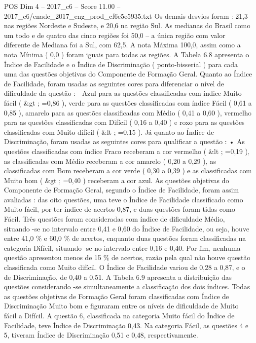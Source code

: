 \begin{textsample}{POS Dim 4 – 2017\_c6 – Score 11.00 – 2017\_c6/enade\_2017\_eng\_prod\_cf6e5e5935.txt}
Os demais desvios foram : 21,3 nas regiões Nordeste e Sudeste, e 20,6 na região Sul.
As medianas do Brasil como um todo e de quatro das cinco regiões foi 50,0 – a única região com valor diferente de Mediana foi a Sul, com 62,5.
A nota Máxima 100,0, assim como a nota Mínima ( 0,0 ) foram iguais para todas as regiões.
A Tabela 6.8 apresenta o Índice de Facilidade e o Índice de Discriminação ( ponto-bisserial ) para cada uma das questões objetivas do Componente de Formação Geral.
Quanto ao Índice de Facilidade, foram usadas as seguintes cores para diferenciar o nível de dificuldade da questão :  Azul para as questões classificadas com índice Muito fácil ( \&gt ; =0,86 ), verde para as questões classificadas com índice Fácil ( 0,61 a 0,85 ), amarelo para as questões classificadas com Médio ( 0,41 a 0,60 ), vermelho para as questões classificadas com Difícil ( 0,16 a 0,40 ) e roxo para as questões classificadas com Muito difícil ( \&lt ; =0,15 ).
Já quanto ao Índice de Discriminação, foram usadas as seguintes cores para qualificar a questão : • As questões classificadas com índice Fraco receberam a cor vermelho ( \&lt ; =0,19 ), as classificadas com Médio receberam a cor amarelo ( 0,20 a 0,29 ), as classificadas com Bom receberam a cor verde ( 0,30 a 0,39 ) e as classificadas com Muito bom ( \&gt ; =0,40 ) receberam a cor azul.
As questões objetivas do Componente de Formação Geral, segundo o Índice de Facilidade, foram assim avaliadas : das oito questões, uma teve o Índice de Facilidade classificado como Muito fácil, por ter índice de acertos 0,87, e duas questões foram tidas como Fácil.
Três questões foram consideradas com índice de dificuldade Médio, situando -se no intervalo entre 0,41 e 0,60 do Índice de Facilidade, ou seja, houve entre 41,0 \% e 60,0 \% de acertos, enquanto duas questões foram classificadas na categoria Difícil, situando -se no intervalo entre 0,16 e 0,40.
Por fim, nenhuma questão apresentou menos de 15 \% de acertos, razão pela qual não houve questão classificada como Muito difícil.
O Índice de Facilidade variou de 0,28 a 0,87, e o de Discriminação, de 0,40 a 0,51.
A Tabela 6.9 apresenta a distribuição das questões considerando -se simultaneamente a classificação dos dois índices.
Todas as questões objetivas de Formação Geral foram classificadas com Índice de Discriminação Muito bom e figuraram entre os níveis de dificuldade de Muito fácil a Difícil.
A questão 6, classificada na categoria Muito fácil do Índice de Facilidade, teve Índice de Discriminação 0,43.
Na categoria Fácil, as questões 4 e 5, tiveram Índice de Discriminação 0,51 e 0,48, respectivamente.

\end{textsample}
